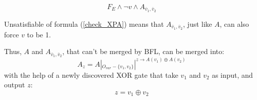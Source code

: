 \documentclass[journal]{IEEEtran}
\begin{document}
\begin{equation}\label{check_XPA}
F_E\wedge \neg v\wedge A_{\overline{v}_1,\overline{v}_2}
\end{equation}

%
%
%
%
%
%
%

Unsatisfiable of formula (\ref{check_XPA}) means that $A_{\overline{v}_1,\overline{v}_2}$,
just like $A$,
can also force $v$ to be 1.

Thus,
$A$ and $A_{\overline{v}_1,\overline{v}_2}$,
that can't be merged by BFL,
can be merged into:
\begin{equation}\label{mergeA}
A_z= A|_{O_{var}-\{v_1,v_2\}}|^{z\to A(v_1)\oplus A(v_2)}
\end{equation}
with the help of a newly discovered XOR gate that take $v_1$ and $v_2$ as input,
and output $z$:
\begin{equation}
z=v_1\oplus v_2
\end{equation}
\end{document}

